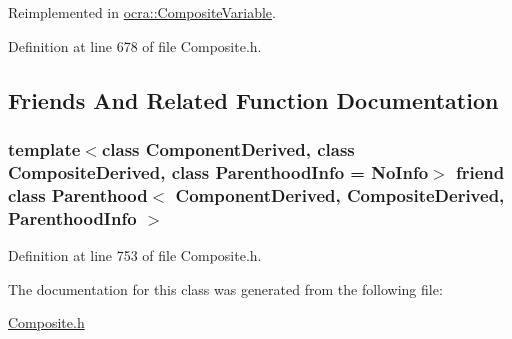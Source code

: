 Reimplemented in \hyperlink{classocra_1_1CompositeVariable_ada9e93c4f85c641e2ec8f1152c0b851a}{ocra\+::\+Composite\+Variable}.



Definition at line 678 of file Composite.\+h.



\subsection{Friends And Related Function Documentation}
\subsubsection[{\texorpdfstring{Parenthood$<$ Component\+Derived, Composite\+Derived, Parenthood\+Info $>$}{Parenthood< ComponentDerived, CompositeDerived, ParenthoodInfo >}}]{\setlength{\rightskip}{0pt plus 5cm}template$<$class Component\+Derived, class Composite\+Derived, class Parenthood\+Info = No\+Info$>$ friend class {\bf Parenthood}$<$ Component\+Derived, Composite\+Derived, Parenthood\+Info $>$\hspace{0.3cm}{\ttfamily [friend]}}\hypertarget{classocra_1_1Composite_ad71e675afae5fce6263d2d784cd3907a}{}\label{classocra_1_1Composite_ad71e675afae5fce6263d2d784cd3907a}


Definition at line 753 of file Composite.\+h.



The documentation for this class was generated from the following file\+:\begin{DoxyCompactItemize}
\item 
\hyperlink{Composite_8h}{Composite.\+h}\end{DoxyCompactItemize}
